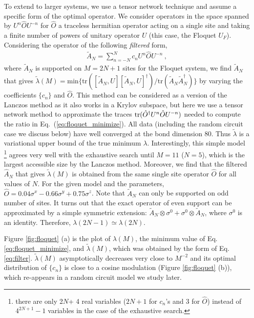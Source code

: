 \documentclass[twocolumn,superscriptaddress, prl,showpacs]{revtex4-1}
\begin{document}
To extend to larger systems, we use a tensor network technique and assume a specific form of the optimal operator.
We consider operators in the space spanned by $U^n \hat{O} U^{- n}$ for $\hat{O}$ a traceless hermitian operator acting on a single site
and taking a finite number of powers of unitary operator $U$ (this case, the Floquet $U_F$).
Considering the operator of the following {\it filtered} form,
\begin{align}
 \tilde{A}_N=\sum_{n=-N}^N c_n U^n \hat{O} U^{- n} ~,
 \label{eq:filter}
\end{align}
where $\tilde{A}_N$ is supported on $M = 2N+1$ sites for the Floquet system,
we find $\tilde{A}_N$ that gives $\tilde{\lambda}(M) = \mathrm{min}\{\mathrm{tr}([\tilde{A}_N,U][\tilde{A}_N,U]^\dag)/\mathrm{tr}(\tilde{A}_N\tilde{A}_N^\dag)\}$
by varying the coefficients $\{c_n\}$ and $\hat{O}$.
This method can be considered as a version of the Lanczos method as it also works in a Krylov subspace,
but here we use a tensor network method to approximate the traces ${\rm tr}(\hat{O}^\dagger U^n \hat{O} U^{-n})$ needed to compute the ratio in Eq.~(\ref{eq:floquet_minimize}). All data (including the random circuit case we discuss below) have well converged at the bond dimension 80.
Thus $\tilde{\lambda}$ is a variational upper bound of the true minimum $\lambda$.
Interestingly, this simple model \footnote{there are only 2$N$+ 4 real variables ($2N+1$ for $c_n$'s and 3 for $\hat{O}$) instead of $4^{2N+1} - 1$ variables
in the case of the exhaustive search.}
agrees very well with the exhaustive search until $M = 11$ ($N = 5$), which is the largest accessible size by the Lanczos method.
Moreover, we find that the filtered $\hat{A}_N$ that gives $\tilde{\lambda}(M)$
is obtained from the same single site operator $\hat{O}$ for all values of $N$.
For the given model and the parameters, $\hat{O} = 0.04\sigma^x  - 0.66\sigma^y + 0.75\sigma^z$.
Note that $\tilde{A}_N$ can only be supported on odd number of sites.
It turns out that the exact operator of even support can be approximated by a simple symmetric extension:
$\tilde{A}_N\otimes \sigma^0 + \sigma^0\otimes\tilde{A}_N$, where $\sigma^0$ is an identity.
Therefore, $\lambda(2N-1) \simeq \lambda(2N)$.


Figure \ref{fig:floquet} (a) is the plot of $\lambda (M)$, the minimum value of Eq. \ref{eq:floquet_minimize}, and
$\tilde{\lambda}(M)$, which was obtained by the form of Eq. \eqref{eq:filter}.
$\tilde{\lambda}(M)$ asymptotically decreases very close to $M^{-2}$
and its optimal distribution of $\{ c_n\}$ is close to a cosine modulation (Figure \ref{fig:floquet} (b)),
which re-appears in a random circuit model we study later.
\end{document}

